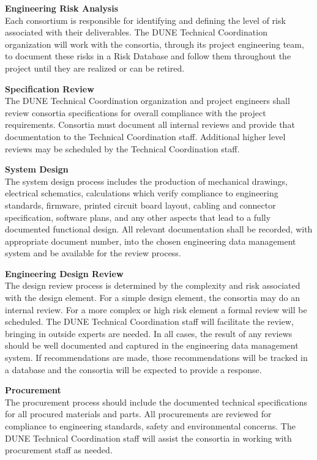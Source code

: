 {\bf Engineering Risk Analysis}\\
Each consortium is responsible for identifying and defining the level
of risk associated with their deliverables.  The DUNE Technical
Coordination organization will work with the consortia, through its
project engineering team, to document these risks in a Risk Database
and follow them throughout the project until they are realized or can
be retired.

{\bf Specification Review}\\
The DUNE Technical Coordination organization and project engineers
shall review consortia specifications for overall compliance with the
project requirements.  Consortia must document all internal reviews
and provide that documentation to the Technical Coordination staff.
Additional higher level reviews may be scheduled by the Technical
Coordination staff.

{\bf System Design}\\
The system design process includes the production of mechanical
drawings, electrical schematics, calculations which verify compliance
to engineering standards, firmware, printed circuit board layout,
cabling and connector specification, software plans, and any other
aspects that lead to a fully documented functional design.  All
relevant documentation shall be recorded, with appropriate document
number, into the chosen engineering data management system and be
available for the review process.

{\bf Engineering Design Review}\\
The design review process is determined by the complexity and risk
associated with the design element.  For a simple design element, the
consortia may do an internal review.  For a more complex or high risk
element a formal review will be scheduled.  The DUNE Technical
Coordination staff will facilitate the review, bringing in outside
experts are needed.  In all cases, the result of any reviews should be
well documented and captured in the engineering data management
system.  If recommendations are made, those recommendations will be
tracked in a database and the consortia will be expected to provide a
response.

{\bf Procurement}\\
The procurement process should include the
documented technical specifications for all procured materials and
parts.  All procurements are reviewed for compliance to engineering
standards, safety and environmental concerns.  The DUNE Technical
Coordination staff will assist the consortia in working with
procurement staff as needed.


